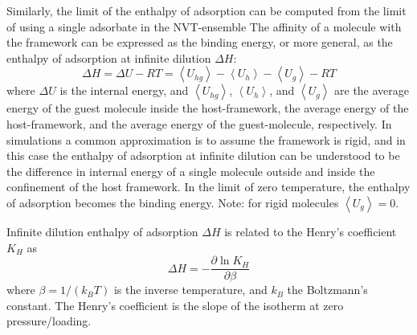 Similarly, the limit of the enthalpy of adsorption can be computed from the limit of using a single adsorbate in the NVT-ensemble
The affinity of a molecule with the framework can be expressed as the binding energy, or more general, as the enthalpy of adsorption
at infinite dilution $\Delta H$:
\begin{equation}
 \Delta H = \Delta U - RT = \left\langle U_{hg}\right\rangle - \left\langle U_{h}\right\rangle - \left\langle U_{g}\right\rangle - RT
 \label{Eq: enthalpy of adsorption at zero loading}
\end{equation}
where $\Delta U$ is the internal energy, and $\left\langle U_{hg}\right\rangle$, $\left\langle U_{h}\right\rangle$, and $\left\langle U_{g}\right\rangle$
are the average energy of the guest molecule inside the host-framework, the average energy of the host-framework, and
the average energy of the guest-molecule, respectively.
In simulations a common approximation is to assume the framework is rigid, and in this case
the enthalpy of adsorption at infinite dilution can be understood to be the difference in internal energy of a single molecule outside
and inside the confinement of the host framework. In the limit of zero temperature, the enthalpy of adsorption becomes the binding energy.
Note: for rigid molecules $\left\langle U_{g}\right\rangle = 0$.
\begin{center}
\end{center}
Infinite dilution enthalpy of adsorption $\Delta H$ is related to the Henry's coefficient $K_H$ as
\begin{equation}
 \Delta H = - \frac{\partial \ln K_H}{\partial \beta}
 \label{Tutorial heat-relation}
\end{equation}
where $\beta=1/\left(k_BT\right)$ is the inverse temperature, and $k_B$ the Boltzmann's constant. The Henry's coefficient is the slope of the
isotherm at zero pressure/loading. 
\begin{center}
\end{center}

